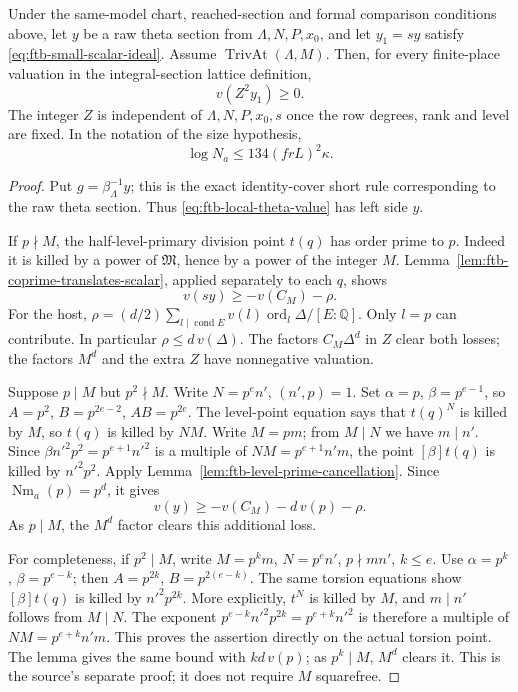 \begin{srproposition}
\label{prop:ftb-one-denominator-all-places}
Under the same-model chart, reached-section and formal comparison
conditions above, let \(y\) be a raw theta section from
\(\Lambda,N,P,x_0\), and let
\(y_1=sy\) satisfy \eqref{eq:ftb-small-scalar-ideal}.
Assume \(\operatorname{TrivAt}(\Lambda,M)\).
Then, for every finite-place valuation in the integral-section
lattice definition,
\[
                              v(Z^2y_1)\ge0 .
\]
The integer \(Z\) is independent of \(\Lambda,N,P,x_0,s\) once the
row degrees, rank and level are fixed.
In the notation of the size hypothesis,
\[
                         \log N_a\le134(frL)^2\kappa .
\]
\end{srproposition}
\begin{proof}
Put \(g=\beta_\Lambda^{-1}y\); this is the exact identity-cover
short rule corresponding to the raw theta section.
Thus \eqref{eq:ftb-local-theta-value} has left side \(y\).

If \(p\nmid M\), the half-level-primary division point \(t(q)\)
has order prime to \(p\).
Indeed it is killed by a power of \(\mathfrak M\), hence by a
power of the integer \(M\).
Lemma~\ref{lem:ftb-coprime-translates-scalar}, applied separately
to each \(q\), shows
\[
                         v(sy)\ge-v(C_M)-\rho .
\]
For the host,
\(\rho=(d/2)\sum_{l\mid\operatorname{cond}E}
 v(l)\operatorname{ord}_l\Delta/[E:\mathbb Q]\).
Only \(l=p\) can contribute.  In particular
\(\rho\le d\,v(\Delta)\).
The factors \(C_M\Delta^d\) in \(Z\) clear both losses;
the factors \(M^d\) and the extra \(Z\) have nonnegative
valuation.

Suppose \(p\mid M\) but \(p^2\nmid M\).
Write \(N=p^e n'\), \((n',p)=1\).
Set \(\alpha=p\), \(\beta=p^{e-1}\), so
\(A=p^2\), \(B=p^{2e-2}\), \(AB=p^{2e}\).
The level-point equation says that \(t(q)^N\) is killed by \(M\),
so \(t(q)\) is killed by \(NM\).
Write \(M=pm\); from \(M\mid N\) we have \(m\mid n'\).
Since
\(\beta n'^2p^2=p^{e+1}n'^2\) is a multiple of
\(NM=p^{e+1}n'm\), the point \([\beta]t(q)\) is killed by
\(n'^2p^2\).
Apply Lemma~\ref{lem:ftb-level-prime-cancellation}.
Since \(\operatorname{Nm}_a(p)=p^d\), it gives
\[
                         v(y)\ge-v(C_M)-d\,v(p)-\rho .
\]
As \(p\mid M\), the \(M^d\) factor clears this additional loss.

For completeness, if \(p^2\mid M\), write \(M=p^km\),
\(N=p^e n'\), \(p\nmid mn'\), \(k\le e\).
Use \(\alpha=p^k\), \(\beta=p^{e-k}\);
then \(A=p^{2k}\), \(B=p^{2(e-k)}\).
The same torsion equations show
\([\beta]t(q)\) is killed by \(n'^2p^{2k}\).
More explicitly, \(t^N\) is killed by \(M\), and
\(m\mid n'\) follows from \(M\mid N\).
The exponent
\(p^{e-k}n'^2p^{2k}=p^{e+k}n'^2\)
is therefore a multiple of
\(NM=p^{e+k}n'm\).
This proves the assertion directly on the actual torsion point.
The lemma gives the same bound with \(kd\,v(p)\);
as \(p^k\mid M\), \(M^d\) clears it.
This is the source's separate  proof; it does
not require \(M\) squarefree.


\end{proof}
